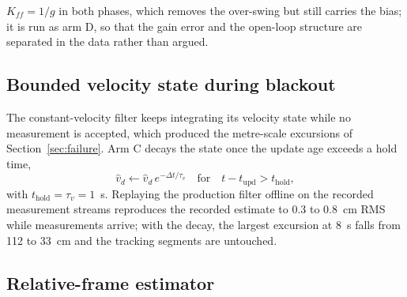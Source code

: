 $K_{ff} = 1/g$ in both phases, which removes the over-swing but still carries the bias; it is run as arm D, so that the gain error and the open-loop structure are separated in the data rather than argued.

\subsection{Bounded velocity state during blackout}

The constant-velocity filter keeps integrating its velocity state while no measurement is accepted, which produced the metre-scale excursions of Section~\ref{sec:failure}. Arm C decays the state once the update age exceeds a hold time,
\begin{equation}
\hat{v}_d \leftarrow \hat{v}_d\, e^{-\Delta t/\tau_v}\quad \text{for}\quad t - t_{\mathrm{upd}} > t_{\mathrm{hold}},
\end{equation}
with $t_{\mathrm{hold}} = \tau_v = 1$~s. Replaying the production filter offline on the recorded measurement streams reproduces the recorded estimate to 0.3 to 0.8~cm RMS while measurements arrive; with the decay, the largest excursion at 8~s falls from 112 to 33~cm and the tracking segments are untouched.

\subsection{Relative-frame estimator}
\label{sec:navobs}

